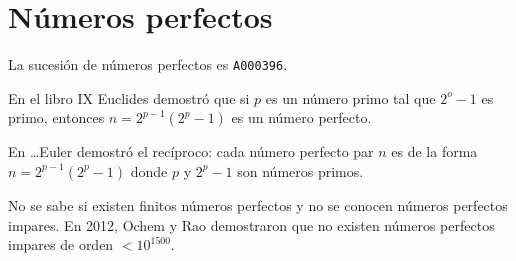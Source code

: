 \chapter{Números perfectos}


La sucesión de números perfectos es \verb+A000396+.  

En el libro IX Euclides
demostró que si $p$ es un número primo tal que $2^o-1$ es primo, entonces
$n=2^{p-1}(2^p-1)$ es un número perfecto.  

En \dots Euler demostró el
recíproco: cada número perfecto par $n$ es de la forma $n=2^{p-1}(2^p-1)$ donde
$p$ y $2^{p}-1$ son números primos. 

No se sabe si existen finitos números perfectos y no se conocen números perfectos impares. 
En 2012, Ochem y Rao demostraron que no existen números perfectos impares de
orden $<10^{1500}$. 
